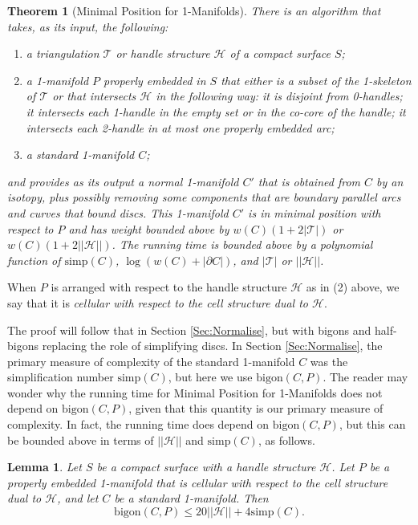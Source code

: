 \documentclass[oneside]{amsart}
\numberwithin{equation}{section}
\theoremstyle{plain}
\newtheorem{theorem}[equation]{Theorem}
\newtheorem{lemma}[equation]{Lemma}
\theoremstyle{definition}
\newcommand{\calT}{{\mathcal{T}}}
\newcommand{\calH}{\mathcal{H}}
\begin{document}
\begin{theorem}[{\sc Minimal Position for 1-Manifolds}]
\label{Thm:MinimalPosition}
There is an algorithm that takes, as its input, the following:
\begin{enumerate}
\item a triangulation $\calT$ or handle structure $\calH$ of a compact surface $S$;
\item a 1-manifold $P$ properly embedded in $S$ that either is a subset of the 1-skeleton of $\calT$ or that intersects $\calH$ in the following way: it is disjoint from 0-handles; it intersects each 1-handle in the empty set or in the co-core of the handle; it intersects each 2-handle in at most one properly embedded arc;
\item a standard 1-manifold $C$;
\end{enumerate}
and provides as its output a normal 1-manifold $C'$ that is obtained from $C$ by an isotopy, plus possibly removing some components that are boundary parallel arcs and curves that bound discs. This 1-manifold $C'$ is in minimal position with respect to $P$ and has weight bounded above by $w(C)(1 + 2|\calT|)$ or $w(C)(1 + 2||\calH||)$. The running time is bounded above by a polynomial function of $\mathrm{simp}(C)$, $\log (w(C) + |\partial C|)$, and $|\calT|$ or $||\calH||$.
\end{theorem}

When $P$ is arranged with respect to the handle structure $\calH$ as in (2) above, we say that it is \emph{cellular with respect to the cell structure dual to $\calH$}.

The proof will follow that in Section \ref{Sec:Normalise}, but with bigons and half-bigons replacing the role of simplifying discs. In Section \ref{Sec:Normalise}, the primary measure of complexity of the standard 1-manifold $C$ was the simplification number $\mathrm{simp}(C)$, but here we use $\mathrm{bigon}(C,P)$. The reader may wonder why the running time for {\sc Minimal Position for 1-Manifolds} does not depend on $\text{bigon}(C,P)$, given that this quantity is our primary measure of complexity. In fact, the running time does depend on $\text{bigon}(C,P)$, but this can be bounded above in terms of $||\calH||$ and $\text{simp}(C)$, as follows.

\begin{lemma}
\label{Lem:BoundBigon}
Let $S$ be a compact surface with a handle structure $\calH$. Let $P$ be a properly embedded 1-manifold that is cellular with respect to the cell structure dual to $\calH$, and let $C$ be a standard 1-manifold. Then
$$\mathrm{bigon}(C,P) \leq 20 ||\calH|| + 4 \mathrm{simp}(C).$$
\end{lemma}
\end{document}
